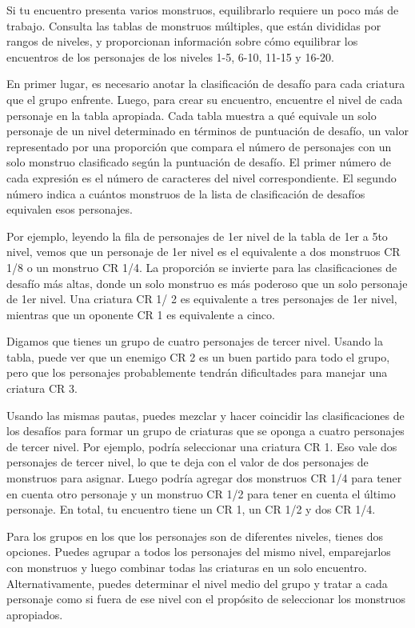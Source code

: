 \documentclass[a4paper,twocolumn,openany,10pt]{dndbook}
\begin{document}
Si tu encuentro presenta varios monstruos, equilibrarlo requiere un poco más de trabajo. Consulta las tablas de monstruos
múltiples, que están divididas por rangos de niveles, y proporcionan información sobre cómo equilibrar los encuentros de los
personajes de los niveles 1-5, 6-10, 11-15 y 16-20.

En primer lugar, es necesario anotar la clasificación de desafío para cada criatura que el grupo enfrente. Luego, para crear su
encuentro, encuentre el nivel de cada personaje en la tabla apropiada. Cada tabla muestra a qué equivale un solo personaje de un
nivel determinado en términos de puntuación de desafío, un valor representado por una proporción que compara el número de
personajes con un solo monstruo clasificado según la puntuación de desafío. El primer número de cada expresión es el número de
caracteres del nivel correspondiente. El segundo número indica a cuántos monstruos de la lista de clasificación de desafíos
equivalen esos personajes. 

Por ejemplo, leyendo la fila de personajes de 1er nivel de la tabla de 1er a 5to nivel, vemos que un personaje de 1er nivel es el
equivalente a dos monstruos CR 1/8 o un monstruo CR 1/4. La proporción se invierte para las clasificaciones de desafío más altas,
donde un solo monstruo es más poderoso que un solo personaje de 1er nivel. Una criatura CR 1/ 2 es equivalente a tres personajes
de 1er nivel, mientras que un oponente CR 1 es equivalente a cinco. 

Digamos que tienes un grupo de cuatro personajes de tercer nivel. Usando la tabla, puede ver que un enemigo CR 2 es un buen
partido para todo el grupo, pero que los personajes probablemente tendrán dificultades para manejar una criatura CR 3.

Usando las mismas pautas, puedes mezclar y hacer coincidir las clasificaciones de los desafíos para formar un grupo de criaturas
que se oponga a cuatro personajes de tercer nivel. Por ejemplo, podría seleccionar una criatura CR 1. Eso vale dos personajes de
tercer nivel, lo que te deja con el valor de dos personajes de monstruos para asignar. Luego podría agregar dos monstruos CR 1/4
para tener en cuenta otro personaje y un monstruo CR 1/2 para tener en cuenta el último personaje. En total, tu encuentro tiene
un CR 1, un CR 1/2 y dos CR 1/4. 

Para los grupos en los que los personajes son de diferentes niveles, tienes dos opciones. Puedes agrupar a todos los personajes
del mismo nivel, emparejarlos con monstruos y luego combinar todas las criaturas en un solo encuentro. Alternativamente, puedes
determinar el nivel medio del grupo y tratar a cada personaje como si fuera de ese nivel con el propósito de seleccionar los
monstruos apropiados.
\end{document}
